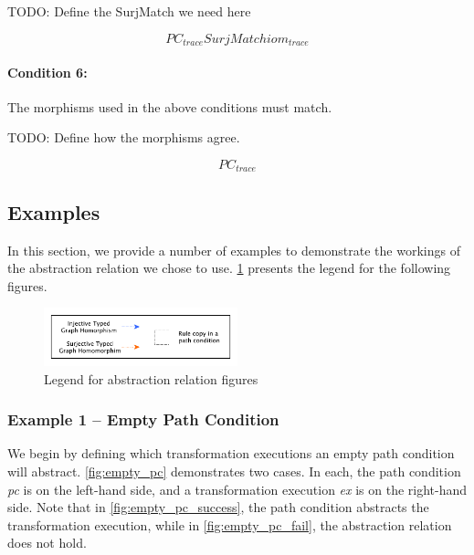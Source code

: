 TODO: Define the SurjMatch we need here

\begin{equation}
\label{eq:abstr_links_surjective}
\mathit{PC}_{trace} SurjMatch \mathit{iom}_{trace}
\end{equation} 

\paragraph{Condition 6:}

The morphisms used in the above conditions must match.

TODO: Define how the morphisms agree.

\begin{equation}
\label{eq:abstr_morphisms_agree}
\mathit{PC}_{trace}
\end{equation} 


\subsection{Examples}

In this section, we provide a number of examples to demonstrate the workings of
the abstraction relation we chose to use. \cref{fig:legend} presents the legend
for the following figures.

\begin{figure}[htb]
 \centering
                \includegraphics[width=0.5\textwidth]{./figures/abstraction_relation/legend.pdf}
                \caption{Legend for abstraction relation figures}
                \label{fig:legend}
\end{figure}
                
\subsubsection{Example 1 -- Empty Path Condition}

We begin by defining which transformation executions an empty path condition
will abstract. \cref{fig:empty_pc} demonstrates two cases. In each, the path
condition \textit{pc} is on the left-hand side, and a transformation execution \textit{ex} is on the
right-hand side. Note that in \cref{fig:empty_pc_success}, the path condition
abstracts the transformation execution, while in \cref{fig:empty_pc_fail}, the
abstraction relation does not hold.

